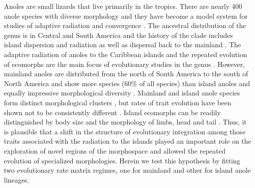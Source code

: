 Anoles are small lizards that live primarily in the tropics. There are nearly 400 anole species with diverse morphology and they have become a model system for studies of adaptive radiation and convergence \citep[][and references therein]{losos_lizards_2009, mahler_exceptional_2013}. The ancestral distribution of the genus is in Central and South America and the history of the clade includes island dispersion and radiation as well as dispersal back to the mainland \citep{nicholson_mainland_2005, losos_lizards_2009}. The adaptive radiation of anoles to the Caribbean islands and the repeated evolution of ecomorphs are the main focus of evolutionary studies in the genus \citep{mahler_ecological_2010, losos_lizards_2009, mahler_exceptional_2013}. However, mainland anoles are distributed from the north of South America to the south of North America and show more species (60\% of all species) than island anoles and equally impressive morphological diversity \citep{losos_lizards_2009}. Mainland and island anole species form distinct morphological clusters \citep{pinto_testing_2008, schaad_patterns_2010, moreno-arias_patterns_2016}, but rates of trait evolution have been shown not to be consistently different \citep{pinto_testing_2008}. Island ecomorphs can be readily distinguished by body size and the morphology of limbs, head and tail \citep{losos_lizards_2009, mahler_exceptional_2013}. Thus, it is plausible that a shift in the structure of evolutionary integration among those traits associated with the radiation to the islands played an important role on the exploration of novel regions of the morphospace and allowed the repeated evolution of specialized morphologies. Herein we test this hypothesis by fitting two evolutionary rate matrix regimes, one for mainland and other for island anole lineages.

